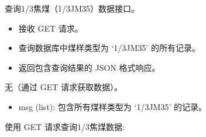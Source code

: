\documentclass[a4paper,12pt,english]{sphinxmanual}
\begin{document}

\begin{fulllineitems}
\label{\detokenize{api/login:login.get31JiaoCoalgData}}
\pysigstartsignatures
{}
\pysigstopsignatures
\sphinxAtStartPar
查询1/3焦煤（1/3JM35）数据接口。
\begin{description}
\begin{itemize}
\item {} 
\sphinxAtStartPar
接收 GET 请求。

\item {} 
\sphinxAtStartPar
查询数据库中煤样类型为 ‘1/3JM35’ 的所有记录。

\item {} 
\sphinxAtStartPar
返回包含查询结果的 JSON 格式响应。

\end{itemize}

\sphinxAtStartPar
无（通过 GET 请求获取数据）。

\begin{description}
\begin{itemize}
\item {} 
\sphinxAtStartPar
msg (list): 包含所有煤样类型为 ‘1/3JM35’ 的记录。

\end{itemize}

\end{description}

\sphinxAtStartPar
使用 GET 请求查询1/3焦煤数据:

\begin{sphinxVerbatim}[commandchars=\\\{\}]
 


\end{sphinxVerbatim}
\end{description}
\end{fulllineitems}
\end{document}
